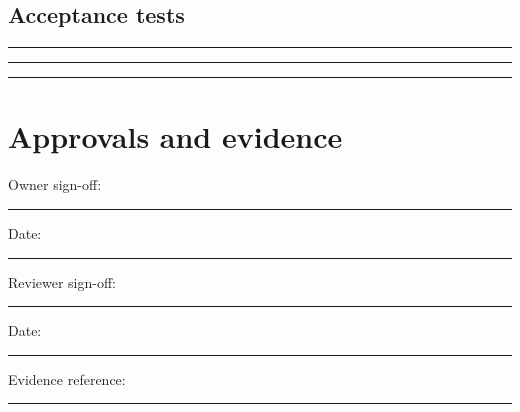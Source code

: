 \documentclass[11pt]{article}
\begin{document}
\subsection{Acceptance tests}
\noindent\rule{\linewidth}{0.3pt}\par\vspace{0.18in}
\noindent\rule{\linewidth}{0.3pt}\par\vspace{0.18in}
\noindent\rule{\linewidth}{0.3pt}\par\vspace{0.14in}

\section{Approvals and evidence}
\noindent Owner sign-off: \rule{0.42\linewidth}{0.4pt}\hfill Date: \rule{0.19\linewidth}{0.4pt}\par\vspace{0.4cm}
\noindent Reviewer sign-off: \rule{0.40\linewidth}{0.4pt}\hfill Date: \rule{0.19\linewidth}{0.4pt}\par\vspace{0.4cm}
\noindent Evidence reference: \rule{0.70\linewidth}{0.4pt}
\end{document}
